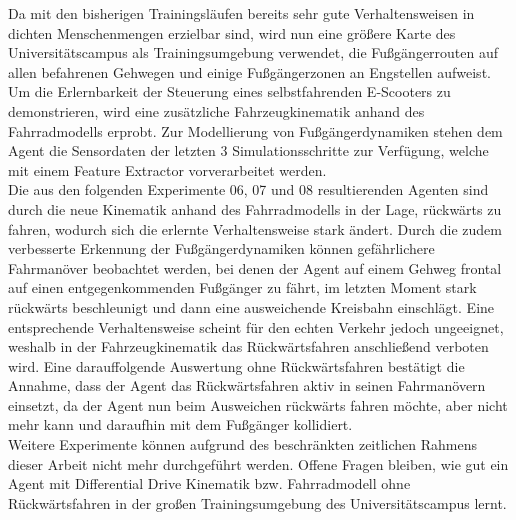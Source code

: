 Da mit den bisherigen Trainingsläufen bereits sehr gute Verhaltensweisen in dichten
Menschenmengen erzielbar sind, wird nun eine größere Karte des Universitätscampus
als Trainingsumgebung verwendet, die Fußgängerrouten auf allen befahrenen Gehwegen und
einige Fußgängerzonen an Engstellen aufweist. Um die Erlernbarkeit der Steuerung eines
selbstfahrenden E-Scooters zu demonstrieren, wird eine zusätzliche Fahrzeugkinematik
anhand des Fahrradmodells erprobt. Zur Modellierung von Fußgängerdynamiken stehen
dem Agent die Sensordaten der letzten 3 Simulationsschritte zur Verfügung, welche mit
einem Feature Extractor vorverarbeitet werden.\\

Die aus den folgenden Experimente 06, 07 und 08 resultierenden Agenten sind durch die
neue Kinematik anhand des Fahrradmodells in der Lage, rückwärts zu fahren, wodurch
sich die erlernte Verhaltensweise stark ändert. Durch die zudem verbesserte Erkennung der
Fußgängerdynamiken können gefährlichere Fahrmanöver beobachtet werden, bei denen der
Agent auf einem Gehweg frontal auf einen entgegenkommenden Fußgänger zu fährt, im letzten
Moment stark rückwärts beschleunigt und dann eine ausweichende Kreisbahn einschlägt.
Eine entsprechende Verhaltensweise scheint für den echten Verkehr jedoch ungeeignet,
weshalb in der Fahrzeugkinematik das Rückwärtsfahren anschließend verboten wird.
Eine darauffolgende Auswertung ohne Rückwärtsfahren bestätigt die Annahme, dass der Agent
das Rückwärtsfahren aktiv in seinen Fahrmanövern einsetzt, da der Agent nun beim Ausweichen
rückwärts fahren möchte, aber nicht mehr kann und daraufhin mit dem Fußgänger kollidiert.\\

Weitere Experimente können aufgrund des beschränkten zeitlichen Rahmens dieser Arbeit
nicht mehr durchgeführt werden. Offene Fragen bleiben, wie gut ein Agent mit Differential
Drive Kinematik bzw. Fahrradmodell ohne Rückwärtsfahren in der großen Trainingsumgebung
des Universitätscampus lernt.
